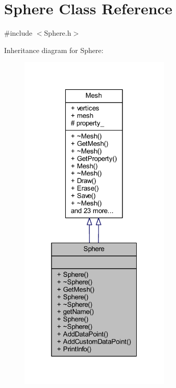 \hypertarget{class_sphere}{}\section{Sphere Class Reference}
\label{class_sphere}


{\ttfamily \#include $<$Sphere.\+h$>$}



Inheritance diagram for Sphere\+:\nopagebreak
\begin{figure}[H]
\begin{center}
\leavevmode
\includegraphics[width=205pt]{class_sphere__inherit__graph}
\end{center}
\end{figure}


